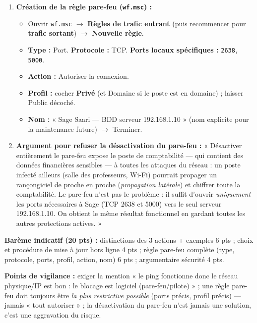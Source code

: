 \documentclass[11pt]{article}
\begin{document}
\begin{corrige}
\begin{enumerate}
\begin{itemize}
    \end{itemize}
    \item \textbf{Création de la règle pare-feu (\texttt{wf.msc}) :}
    \begin{itemize}
        \item Ouvrir \texttt{wf.msc} $\rightarrow$ \textbf{Règles de trafic entrant} (puis recommencer pour \textbf{trafic sortant}) $\rightarrow$ \textbf{Nouvelle règle}.
        \item \textbf{Type :} Port. \textbf{Protocole :} TCP. \textbf{Ports locaux spécifiques :} \texttt{2638, 5000}.
        \item \textbf{Action :} Autoriser la connexion.
        \item \textbf{Profil :} cocher \textbf{Privé} (et Domaine si le poste est en domaine) ; laisser Public décoché.
        \item \textbf{Nom :} « Sage Saari — BDD serveur 192.168.1.10 » (nom explicite pour la maintenance future) $\rightarrow$ Terminer.
    \end{itemize}
    \item \textbf{Argument pour refuser la désactivation du pare-feu :} « Désactiver entièrement le pare-feu expose le poste de comptabilité — qui contient des données financières sensibles — à toutes les attaques du réseau : un poste infecté ailleurs (salle des professeurs, Wi-Fi) pourrait propager un rançongiciel de proche en proche (\emph{propagation latérale}) et chiffrer toute la comptabilité. Le pare-feu n'est pas le problème : il suffit d'ouvrir \emph{uniquement} les ports nécessaires à Sage (TCP 2638 et 5000) vers le seul serveur 192.168.1.10. On obtient le même résultat fonctionnel en gardant toutes les autres protections actives. »
\end{enumerate}

\textbf{Barème indicatif (20 pts) :} distinctions des 3 actions + exemples 6 pts ; choix et procédure de mise à jour hors ligne 4 pts ; règle pare-feu complète (type, protocole, ports, profil, action, nom) 6 pts ; argumentaire sécurité 4 pts.

\textbf{Points de vigilance :} exiger la mention « le ping fonctionne donc le réseau physique/IP est bon : le blocage est logiciel (pare-feu/pilote) » ; une règle pare-feu doit toujours être \emph{la plus restrictive possible} (ports précis, profil précis) — jamais « tout autoriser » ; la désactivation du pare-feu n'est jamais une solution, c'est une aggravation du risque.
\end{corrige}
\end{document}
